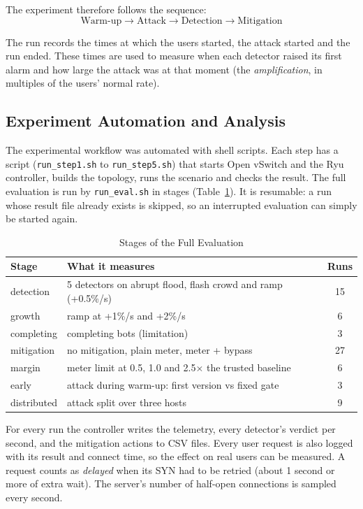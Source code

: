 \documentclass[12pt,a4paper]{article}
\begin{document}
The experiment therefore follows the sequence:
\[
  \text{Warm-up} \rightarrow \text{Attack} \rightarrow \text{Detection}
  \rightarrow \text{Mitigation}
\]

The run records the times at which the users started, the attack started and
the run ended. These times are used to measure when each detector raised its
first alarm and how large the attack was at that moment (the
\emph{amplification}, in multiples of the users' normal rate).

\subsection{Experiment Automation and Analysis}
The experimental workflow was automated with shell scripts. Each step has a
script (\texttt{run\_step1.sh} to \texttt{run\_step5.sh}) that starts Open vSwitch
and the Ryu controller, builds the topology, runs the scenario and checks the
result. The full evaluation is run by \texttt{run\_eval.sh} in stages
(Table~\ref{tab:stages}). It is resumable: a run whose result file already
exists is skipped, so an interrupted evaluation can simply be started again.

\begin{table}[H]
\centering
\caption{Stages of the Full Evaluation}
\label{tab:stages}
\begin{tabular}{lp{8.3cm}c}
\toprule
Stage & What it measures & Runs \\
\midrule
detection   & 5 detectors on abrupt flood, flash crowd and ramp (+0.5\%/s) & 15 \\
growth      & ramp at +1\%/s and +2\%/s & 6 \\
completing  & completing bots (limitation) & 3 \\
mitigation  & no mitigation, plain meter, meter + bypass & 27 \\
margin      & meter limit at 0.5, 1.0 and 2.5$\times$ the trusted baseline & 6 \\
early       & attack during warm-up: first version vs fixed gate & 3 \\
distributed & attack split over three hosts & 9 \\
\bottomrule
\end{tabular}
\end{table}

For every run the controller writes the telemetry, every detector's verdict per
second, and the mitigation actions to CSV files. Every user request is also
logged with its result and connect time, so the effect on real users can be
measured. A request counts as \emph{delayed} when its SYN had to be retried
(about 1 second or more of extra wait). The server's number of half-open
connections is sampled every second.
\end{document}
